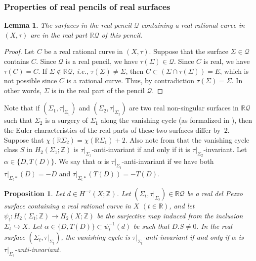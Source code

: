 \documentclass[10pt,a4paper]{article}
\numberwithin{equation}{section}
\theoremstyle{definition}
\theoremstyle{plain}
\newtheorem{proposition}[definition]{Proposition}
\newtheorem{lemma}[definition]{Lemma}
\theoremstyle{remark}
\newcommand{\R}{\mathbb{R}}
\newcommand{\Z}{\mathbb{Z}}
\begin{document}
\subsubsection{Properties of real pencils of real surfaces}

 
\begin{lemma} \label{lem-surfaces.in.real.pencil}
The surfaces in the real pencil $\mathcal{Q}$ containing a real rational curve in $(X,\tau)$ are in the real part $\R \mathcal{Q}$ of this pencil.
\end{lemma}

\begin{proof}
  Let $C$ be a real rational curve in $(X,\tau)$. Suppose that the surface $\Sigma\in \mathcal{Q}$ contains $C$. Since $\mathcal{Q}$ is a real pencil, we have $\tau(\Sigma)\in \mathcal{Q}$. Since $C$ is real, we have $\tau(C)=C$.  If $\Sigma\notin \R \mathcal{Q}$, \textit{i.e.}, $\tau(\Sigma)\neq \Sigma$, then $C\subset (\Sigma\cap \tau(\Sigma))=E$, which is not possible since $C$ is a rational curve. Thus, by contradiction  $\tau(\Sigma)=\Sigma$. In other words, $\Sigma$ is in the real part of the pencil $\mathcal{Q}$.
\end{proof}

Note that if $(\Sigma_1,\tau|_{\Sigma_1})$ and $(\Sigma_2,\tau|_{\Sigma_2})$ are two real non-singular surfaces in $\R \mathcal{Q}$ such that $\Sigma_2$ is a surgery of $\Sigma_1$ along the vanishing cycle (as formalized in \cite{brugalle2018surgery}), then the Euler characteristics of the real parts of these two surfaces differ by~$2$. Suppose that $\chi(\R \Sigma_2)=\chi(\R \Sigma_1)+ 2$. Also note  from \cite{brugalle2018surgery} that the vanishing cycle class $S$ in $H_2(\Sigma_1;\Z)$ is $\tau|_{\Sigma_1}$-anti-invariant if and only if it is $\tau|_{\Sigma_2}$-invariant.  Let $\alpha \in \{D,T(D)\}$. We say that $\alpha$ is $\tau|_{\Sigma_t}$-anti-invariant if we have both
$\tau|_{\Sigma_t*}(D)=-D$ and
$\tau|_{\Sigma_t*}(T(D))=-T(D)$.

\begin{proposition} \label{prop-tau.vs.mu}
Let $d\in H^{-\tau}(X;\Z)$. Let $(\Sigma_t,\tau|_{\Sigma_t}) \in \R \mathcal{Q}$ be a real del Pezzo surface containing a real rational curve in $X$ $(t\in {\R})$, and let $\psi_t\colon  H_2(\Sigma_t;\mathbb{Z})\rightarrow H_2(X;\mathbb{Z})$ be the surjective map  induced from the inclusion $\Sigma_t\hookrightarrow X$. Let $\alpha \in \{D,T(D)\}\subset \psi_t^{-1}(d)$ be such that $D.S\neq 0$. In the real surface $(\Sigma_t,\tau|_{\Sigma_t})$, the vanishing cycle is $\tau|_{\Sigma_t}$-anti-invariant if and only if $\alpha$ is $\tau|_{\Sigma_t}$-anti-invariant.
\end{proposition}  
\end{document}
